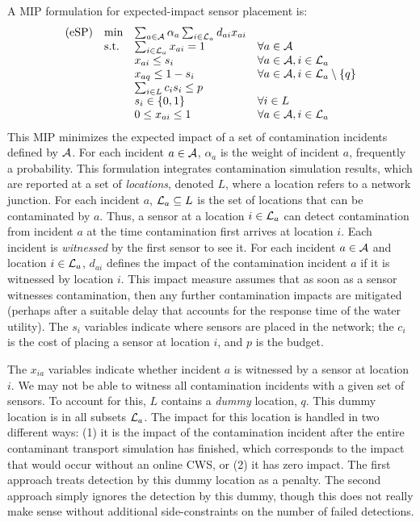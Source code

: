 A MIP formulation for expected-\/impact sensor placement is: \[ \label{eqn:SP} \begin{array}{llll} {\rm (eSP)} & \min & \sum_{a \in {\cal A}} \alpha_a \sum_{i \in {\cal L}_a} d_{ai} x_{ai} &\\ & {\rm s.t.} & \sum_{i\in {\cal L}_a} x_{ai} = 1 & \forall a \in {\cal A}\\ & & x_{ai} \le s_i & \forall a \in {\cal A}, i \in {\cal L}_a\\ & & x_{aq} \leq 1-s_i & \forall a \in {\cal A}, i \in {\cal L}_a \setminus \{q\}\\ & & \sum_{i \in L} c_i s_i \le p&\\ & & s_i \in \{0,1\} & \forall i \in L\\ & & 0 \leq x_{ai} \leq 1 & \forall a \in {\cal A}, i \in {\cal L}_a \end{array} \] This MIP minimizes the expected impact of a set of contamination incidents defined by ${\cal A}$. For each incident $a \in {\cal A}$, $\alpha_a$ is the weight of incident $a$, frequently a probability. This formulation integrates contamination simulation results, which are reported at a set of {\itshape locations\/}, denoted $L$, where a location refers to a network junction. For each incident $a$, ${\cal L}_a \subseteq L$ is the set of locations that can be contaminated by $a$. Thus, a sensor at a location $i \in {\cal L}_a$ can detect contamination from incident $a$ at the time contamination first arrives at location $i$. Each incident is {\itshape witnessed\/} by the first sensor to see it. For each incident $a \in {\cal A}$ and location $i \in {\cal L}_a$, $d_{ai}$ defines the impact of the contamination incident $a$ if it is witnessed by location $i$. This impact measure assumes that as soon as a sensor witnesses contamination, then any further contamination impacts are mitigated (perhaps after a suitable delay that accounts for the response time of the water utility). The $s_i$ variables indicate where sensors are placed in the network; the $c_i$ is the cost of placing a sensor at location $i$, and $p$ is the budget.

The $x_{ia}$ variables indicate whether incident $a$ is witnessed by a sensor at location $i$. We may not be able to witness all contamination incidents with a given set of sensors. To account for this, $L$ contains a {\itshape dummy\/} location, $q$. This dummy location is in all subsets ${\cal L}_a$. The impact for this location is handled in two different ways: (1) it is the impact of the contamination incident after the entire contaminant transport simulation has finished, which corresponds to the impact that would occur without an online CWS, or (2) it has zero impact. The first approach treats detection by this dummy location as a penalty. The second approach simply ignores the detection by this dummy, though this does not really make sense without additional side-\/constraints on the number of failed detections.

